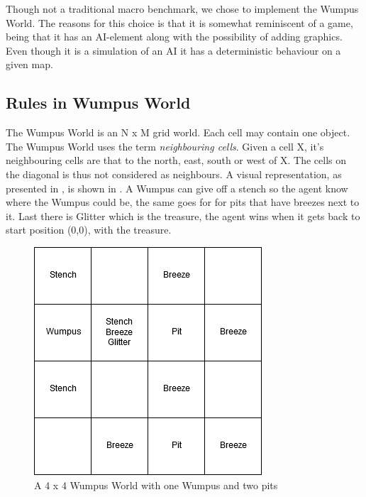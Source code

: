 Though not a traditional macro benchmark, we chose to implement the Wumpus World. The reasons for this choice is that it is somewhat reminiscent of a game, being that it has an \ac{AI}-element along with the possibility of adding graphics. Even though it is a simulation of an \ac{AI} it has a deterministic behaviour on a given map.

\subsection{Rules in Wumpus World}
The Wumpus World is an N x M grid world. Each cell may contain one object. The Wumpus World uses the term \textit{neighbouring cells}. Given a cell X, it's neighbouring cells are that to the north, east, south or west of X. The cells on the diagonal is thus not considered as neighbours. A visual representation, as presented in \cite{wumpus:world}, is shown in .
A Wumpus can give off a stench so the agent know where the Wumpus could be, the same goes for for pits that have breezes next to it. 
Last there is Glitter which is the treasure, the agent wins when it gets back to start position (0,0), with the treasure.

\begin{figure}
    \centering
    \includegraphics[width=.5\textwidth]{images/wumpus.png}
    \caption{A 4 x 4 Wumpus World with one Wumpus and two pits \cite{wumpus:world}}
    \label{fig:wumpus:world}
\end{figure}

